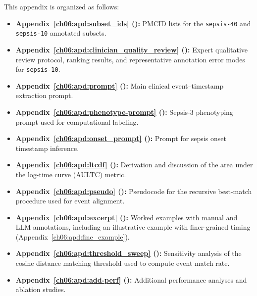 


This appendix is organized as follows:

\begin{itemize}
    \item \textbf{Appendix~\ref{ch06:apd:subset_ids} ():} PMCID lists for the \texttt{sepsis-40} and \texttt{sepsis-10} annotated subsets.

    \item \textbf{Appendix~\ref{ch06:apd:clinician_quality_review} ():} Expert qualitative review protocol, ranking results, and representative annotation error modes for \texttt{sepsis-10}.

    \item \textbf{Appendix~\ref{ch06:apd:prompt} ():} Main clinical event--timestamp extraction prompt.

    \item \textbf{Appendix~\ref{ch06:apd:phenotype-prompt} ():} Sepsis-3 phenotyping prompt used for computational labeling.

    \item \textbf{Appendix~\ref{ch06:apd:onset_prompt} ():} Prompt for sepsis onset timestamp inference.

    \item \textbf{Appendix~\ref{ch06:apd:ltcdf} ():} Derivation and discussion of the area under the log-time curve (AULTC) metric.

    \item \textbf{Appendix~\ref{ch06:apd:pseudo} ():} Pseudocode for the recursive best-match procedure used for event alignment.

    \item \textbf{Appendix~\ref{ch06:apd:excerpt} ():} Worked examples with manual and LLM annotations, including an illustrative example with finer-grained timing (Appendix~\ref{ch06:apd:fine_example}).

    \item \textbf{Appendix~\ref{ch06:apd:threshold_sweep} ():} Sensitivity analysis of the cosine distance matching threshold used to compute event match rate.

    \item \textbf{Appendix~\ref{ch06:apd:add-perf} ():} Additional performance analyses and ablation studies.


\end{itemize}
